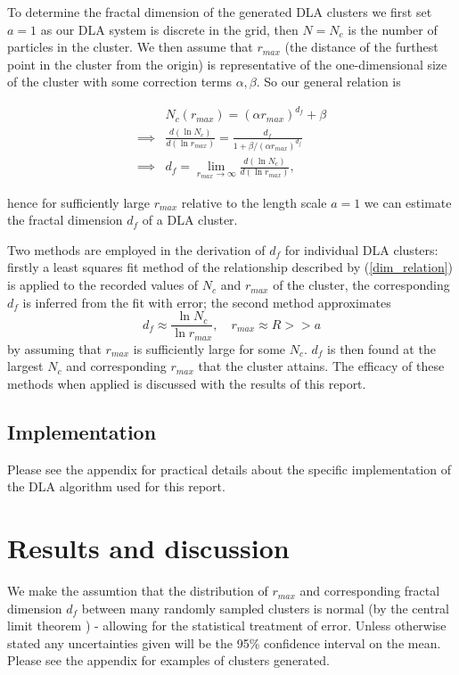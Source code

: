 \documentclass[10pt, twocolumn]{article} %
\begin{document}
      To determine the fractal dimension of the generated DLA clusters we first set $a=1$ as our DLA system is discrete in the grid, then $N=N_c$ is the number of particles in the cluster. We then assume that $r_{max}$ (the distance of the furthest point in the cluster from the origin) is representative of the one-dimensional size of the cluster with some correction terms $\alpha, \beta$. So our general relation is

  \begin{equation}
    \begin{aligned}
    & N_c(r_{max}) = (\alpha r_{max})^{d_f}+\beta\\
    \implies & \frac{d(\ln{N_c})}{d(\ln{r_{max}})} = \frac{d_f}{1 + \beta/(\alpha r_{max})^{d_f}}\\
    \implies & d_f = \lim\limits_{r_{max} \to \infty} \frac{d(\ln{N_c})}{d(\ln{r_{max}})},
    \end{aligned}
    \label{dim_relation}
  \end{equation}

  hence for sufficiently large $r_{max}$ relative to the length scale $a = 1$ we can estimate the fractal dimension $d_f$ of a DLA cluster. 

  Two methods are employed in the derivation of $d_f$ for individual DLA clusters: firstly a least squares fit method of the relationship described by (\ref{dim_relation}) is applied to the recorded values of $N_c$ and $r_{max}$ of the cluster, the corresponding $d_f$ is inferred from the fit with error; the second method approximates
  \begin{equation}
    d_f \approx \frac{\ln{N_c}}{\ln{r_{max}}}, \quad r_{max} \approx R >> a
    \label{dim_approx}
  \end{equation}
      by assuming that $r_{max}$ is sufficiently large for some $N_c$. $d_f$ is then found at the largest $N_c$ and corresponding $r_{max}$ that the cluster attains. The efficacy of these methods when applied is discussed with the results of this report.

\subsection*{Implementation}
  Please see the appendix for practical details about the specific implementation of the DLA algorithm used for this report.

\section*{Results and discussion}
  We make the assumtion that the distribution of $r_{max}$ and corresponding fractal dimension $d_f$ between many randomly sampled clusters is normal (by the central limit theorem \cite{Sadovnik_2016}) - allowing for the statistical treatment of error. Unless otherwise stated any uncertainties given will be the 95\% confidence interval on the mean. Please see the appendix for examples of clusters generated.
\end{document}
